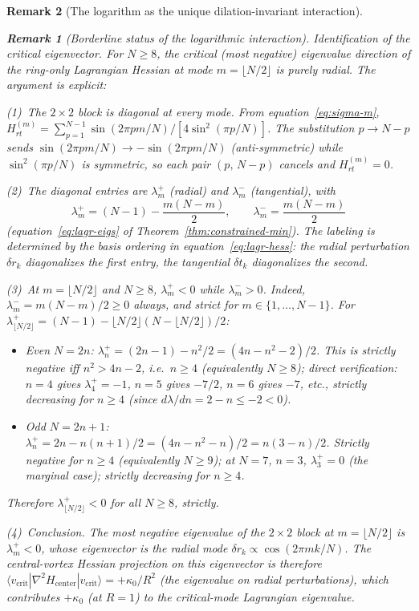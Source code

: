 \documentclass[12pt, a4paper]{article}
\newtheorem{remark}{Remark}[section]
\numberwithin{equation}{section}
\begin{document}
\begin{remark}[The logarithm as the unique dilation-invariant interaction]
\begin{remark}[Borderline status of the logarithmic interaction]
\emph{Identification of the critical eigenvector.}
For $N \ge 8$, the critical (most negative) eigenvalue direction
of the ring-only Lagrangian Hessian at mode $m = \lfloor N/2\rfloor$
is \emph{purely radial}.  The argument is explicit:

(1)~\emph{The $2\times 2$ block is diagonal at every mode}.
From equation~\eqref{eq:sigma-m},
$H_{rt}^{(m)} = \sum_{p=1}^{N-1}\sin(2\pi pm/N)/[4\sin^2(\pi p/N)]$.
The substitution $p \to N{-}p$ sends
$\sin(2\pi pm/N) \to -\sin(2\pi pm/N)$
(anti-symmetric) while $\sin^2(\pi p/N)$ is symmetric, so
each pair $(p,\,N{-}p)$ cancels and $H_{rt}^{(m)} = 0$.

(2)~\emph{The diagonal entries are $\lambda_m^+$ (radial) and
$\lambda_m^-$ (tangential)}, with
\[
  \lambda_m^+ = (N{-}1) - \frac{m(N{-}m)}{2}, \qquad
  \lambda_m^- = \frac{m(N{-}m)}{2}
\]
(equation~\eqref{eq:lagr-eigs} of Theorem~\ref{thm:constrained-min}).
The labeling is determined by the basis ordering in
equation~\eqref{eq:lagr-hess}: the radial perturbation
$\delta r_k$ diagonalizes the first entry, the tangential $\delta t_k$
diagonalizes the second.

(3)~\emph{At $m = \lfloor N/2\rfloor$ and $N \ge 8$,
$\lambda_m^+ < 0$ while $\lambda_m^- > 0$}.
Indeed, $\lambda_m^- = m(N{-}m)/2 \ge 0$ always, and strict for
$m \in \{1,\ldots,N{-}1\}$.  For $\lambda_{\lfloor N/2\rfloor}^+
= (N{-}1) - \lfloor N/2\rfloor(N{-}\lfloor N/2\rfloor)/2$:
\begin{itemize}
  \item \emph{Even $N = 2n$:} $\lambda_n^+ = (2n{-}1) - n^2/2
    = (4n - n^2 - 2)/2$.  This is strictly negative iff $n^2 > 4n - 2$,
    i.e.\ $n \ge 4$ (equivalently $N \ge 8$); direct verification:
    $n = 4$ gives $\lambda_4^+ = -1$, $n = 5$ gives $-7/2$,
    $n = 6$ gives $-7$, etc., strictly decreasing for $n \ge 4$
    (since $d\lambda/dn = 2 - n \le -2 < 0$).
  \item \emph{Odd $N = 2n+1$:} $\lambda_n^+ = 2n - n(n{+}1)/2
    = (4n - n^2 - n)/2 = n(3 - n)/2$.  Strictly negative for
    $n \ge 4$ (equivalently $N \ge 9$); at $N = 7$, $n = 3$,
    $\lambda_3^+ = 0$ (the marginal case); strictly decreasing
    for $n \ge 4$.
\end{itemize}
Therefore $\lambda_{\lfloor N/2\rfloor}^+ < 0$ for all $N \ge 8$,
strictly.

(4)~\emph{Conclusion}.
The most negative eigenvalue of the $2 \times 2$ block at
$m = \lfloor N/2\rfloor$ is $\lambda_m^+ < 0$, whose eigenvector
is the \emph{radial} mode $\delta r_k \propto \cos(2\pi m k/N)$.
The central-vortex Hessian projection on this eigenvector is
therefore
$\langle v_{\mathrm{crit}} | \nabla^2 H_{\mathrm{center}} |
v_{\mathrm{crit}} \rangle = +\kappa_0/R^2$
(the eigenvalue on radial perturbations), which contributes
$+\kappa_0$ (at $R = 1$) to the critical-mode Lagrangian
eigenvalue.


\end{remark}
\end{remark}
\end{document}
